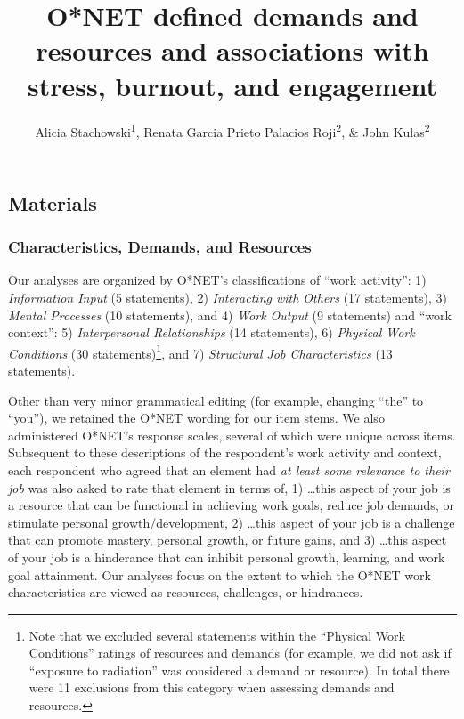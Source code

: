 \documentclass[
  english,
  man]{apa6}
\title{O*NET defined demands and resources and associations with stress, burnout, and engagement}
\author{Alicia Stachowski\textsuperscript{1}, Renata Garcia Prieto Palacios Roji\textsuperscript{2}, \& John Kulas\textsuperscript{2}}
\date{}
\affiliation{\vspace{0.5cm}\textsuperscript{1} University of Wisconsin - Stout\\\textsuperscript{2} Montclair State University}
\begin{document}
\maketitle

\hypertarget{materials}{%
\subsection{Materials}\label{materials}}

\hypertarget{characteristics-demands-and-resources}{%
\subsubsection{Characteristics, Demands, and Resources}\label{characteristics-demands-and-resources}}

Our analyses are organized by O*NET's classifications of \enquote{work activity}: 1) \emph{Information Input} (5 statements), 2) \emph{Interacting with Others} (17 statements), 3) \emph{Mental Processes} (10 statements), and 4) \emph{Work Output} (9 statements) and \enquote{work context}: 5) \emph{Interpersonal Relationships} (14 statements), 6) \emph{Physical Work Conditions} (30 statements)\footnote{Note that we excluded several statements within the \enquote{Physical Work Conditions} ratings of resources and demands (for example, we did not ask if \enquote{exposure to radiation} was considered a demand or resource). In total there were 11 exclusions from this category when assessing demands and resources.}, and 7) \emph{Structural Job Characteristics} (13 statements).

Other than very minor grammatical editing (for example, changing \enquote{the} to \enquote{you}), we retained the O*NET wording for our item stems. We also administered O*NET's response scales, several of which were unique across items. Subsequent to these descriptions of the respondent's work activity and context, each respondent who agreed that an element had \emph{at least some relevance to their job} was also asked to rate that element in terms of, 1) \ldots this aspect of your job is a resource that can be functional in achieving work goals, reduce job demands, or stimulate personal growth/development, 2) \ldots this aspect of your job is a challenge that can promote mastery, personal growth, or future gains, and 3) \ldots this aspect of your job is a hinderance that can inhibit personal growth, learning, and work goal attainment. Our analyses focus on the extent to which the O*NET work characteristics are viewed as resources, challenges, or hindrances.
\end{document}
